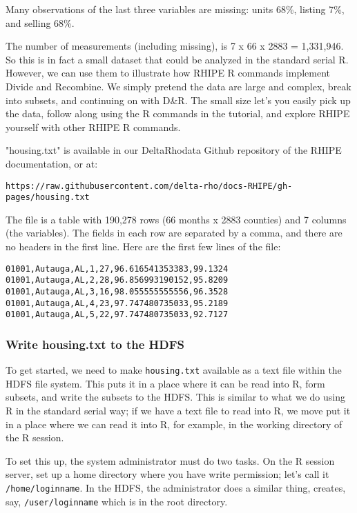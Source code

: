Many observations of the last three variables are missing: units 68\%, listing
7\%, and selling 68\%.

The number of measurements (including missing), is 7 x 66 x 2883 = 1,331,946.
So this is in fact a small dataset that could be analyzed in the standard
serial R. However, we can use them to illustrate how RHIPE R commands implement
Divide and Recombine. We simply pretend the data are large and complex, break
into subsets, and continuing on with D\&R. The small size let's you easily
pick up the data, follow along using the R commands in the tutorial, and
explore RHIPE yourself with other RHIPE R commands.

"housing.txt" is available in our DeltaRhodata Github repository of the
RHIPE documentation, or at:
\begin{verbatim}
https://raw.githubusercontent.com/delta-rho/docs-RHIPE/gh-pages/housing.txt
\end{verbatim}

The file is a table with 190,278 rows (66 months x 2883 counties) and
7 columns (the variables). The fields in each row are separated by a comma,
and there are no headers in the first line. Here are the first few lines of
the file:

\begin{verbatim}
01001,Autauga,AL,1,27,96.616541353383,99.1324
01001,Autauga,AL,2,28,96.856993190152,95.8209
01001,Autauga,AL,3,16,98.055555555556,96.3528
01001,Autauga,AL,4,23,97.747480735033,95.2189
01001,Autauga,AL,5,22,97.747480735033,92.7127
\end{verbatim}

\subsubsection{Write housing.txt to the HDFS}

To get started, we need to make \texttt{housing.txt} available as a text file within
the HDFS file system. This puts it in a place where it can be read into R, form
subsets, and write the subsets to the HDFS. This is similar to what we do
using R in the standard serial way; if we have a text file to read into R, we
move put it in a place where we can read it into R, for example, in the working
directory of the R session.

To set this up, the system administrator must do two tasks.
On the R session server, set up a home directory where you have write
permission; let's call it \texttt{/home/loginname}.
In the HDFS, the administrator does a similar thing, creates, say,
\texttt{/user/loginname} which is in the root directory.

